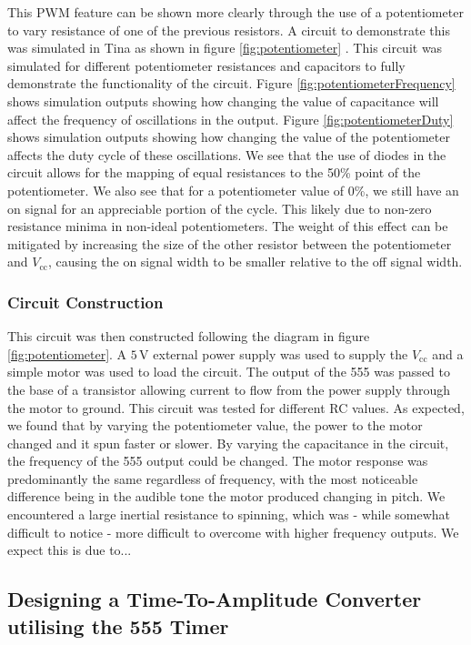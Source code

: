 \documentclass[%
 reprint,
 amsmath,amssymb,
 aps,
]{revtex4-2}
\begin{document}
        This PWM feature can be shown more clearly through the use of a potentiometer to vary resistance of one of the previous resistors. A circuit to demonstrate this was simulated in Tina as shown in figure \ref{fig:potentiometer} \cite{tina}. This circuit was simulated for different potentiometer resistances and capacitors to fully demonstrate the functionality of the circuit. Figure \ref{fig:potentiometerFrequency} shows simulation outputs showing how changing the value of capacitance will affect the frequency of oscillations in the output. Figure \ref{fig:potentiometerDuty} shows simulation outputs showing how changing the value of the potentiometer affects the duty cycle of these oscillations. We see that the use of diodes in the circuit allows for the mapping of equal resistances to the 50\% point of the potentiometer. We also see that for a potentiometer value of 0\%, we still have an on signal for an appreciable portion of the cycle. This likely due to non-zero resistance minima in non-ideal potentiometers. The weight of this effect can be mitigated by increasing the size of the other resistor between the potentiometer and $V_\text{cc}$, causing the on signal width to be smaller relative to the off signal width.


        \subsubsection{Circuit Construction}
        This circuit was then constructed following the diagram in figure \ref{fig:potentiometer}. A $5\,\text{V}$ external power supply was used to supply the $V_\text{cc}$ and a simple motor was used to load the circuit. The output of the 555 was passed to the base of a transistor allowing current to flow from the power supply through the motor to ground. This circuit was tested for different RC values. As expected, we found that by varying the potentiometer value, the power to the motor changed and it spun faster or slower. By varying the capacitance in the circuit, the frequency of the 555 output could be changed. The motor response was predominantly the same regardless of frequency, with the most noticeable difference being in the audible tone the motor produced changing in pitch. We encountered a large inertial resistance to spinning, which was - while somewhat difficult to notice - more difficult to overcome with higher frequency outputs. We expect this is due to...



    \subsection{Designing a Time-To-Amplitude Converter utilising the 555 Timer}
\end{document}
